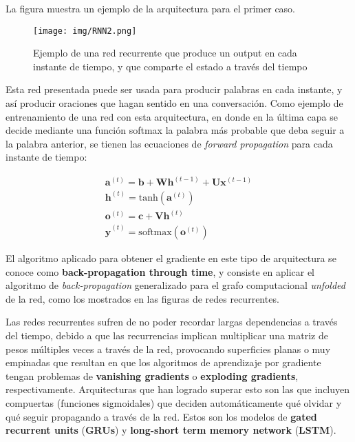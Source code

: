 La figura muestra un ejemplo de la arquitectura para el primer caso.

\begin{figure}[H]
\captionsetup{font=small,labelfont=small}
\caption{Ejemplo de una red recurrente que produce un output en cada instante de tiempo, y que comparte el estado a trav\'es del tiempo}
\centering
\texttt{[image: img/RNN2.png]}
\end{figure}

Esta red presentada puede ser usada para producir palabras en cada instante, y as\'i producir oraciones que hagan sentido en una conversaci\'on. Como ejemplo de entrenamiento de una red con esta arquitectura, en donde en la \'ultima capa se decide mediante una funci\'on softmax la palabra m\'as probable que deba seguir a la palabra anterior, se tienen las ecuaciones de \textit{forward propagation} para cada instante de tiempo:

\begin{equation}
\begin{array}{l}
\bm{a}^{(t)} = \bm{b} + \bm{W}\bm{h}^{(t-1)}+\bm{U}\bm{x}^{(t-1)} \\
\bm{h}^{(t)} = \textrm{tanh}(\bm{a}^{(t)}) \\
\bm{o}^{(t)} = \bm{c} + \bm{V}\bm{h}^{(t)} \\
\hat{\bm{y}}^{(t)} = \textrm{softmax}(\bm{o}^{(t)})
\end{array}
\end{equation}

El algoritmo aplicado para obtener el gradiente en este tipo de arquitectura se conoce como \textbf{back-propagation through time}, y consiste en aplicar el algoritmo de \textit{back-propagation} generalizado para el grafo computacional \textit{unfolded} de la red, como los mostrados en las figuras de redes recurrentes.

Las redes recurrentes sufren de no poder recordar largas dependencias a trav\'es del tiempo, debido a que las recurrencias implican multiplicar una matriz de pesos m\'ultiples veces a trav\'es de la red, provocando superficies planas o muy empinadas que resultan en que los algoritmos de aprendizaje por gradiente tengan problemas de \textbf{vanishing gradients} o \textbf{exploding gradients}, respectivamente. Arquitecturas que han logrado superar esto son las que incluyen compuertas (funciones sigmoidales) que deciden autom\'aticamente qu\'e olvidar y qu\'e seguir propagando a trav\'es de la red. Estos son los modelos de \textbf{gated recurrent units} (\textbf{GRUs}) y \textbf{long-short term memory network} (\textbf{LSTM}).

